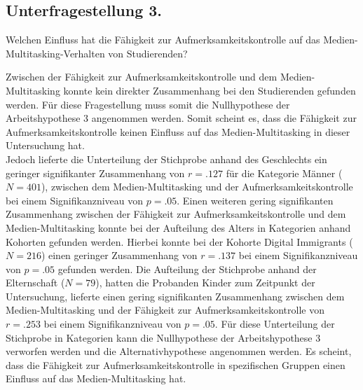 \subsection{Unterfragestellung 3.} Welchen Einfluss hat die Fähigkeit zur Aufmerksamkeitskontrolle auf das Medien-Multitasking-Verhalten von Studierenden?

Zwischen der Fähigkeit zur Aufmerksamkeitskontrolle und dem Medien-Multitasking konnte kein direkter Zusammenhang bei den Studierenden gefunden werden. Für diese Fragestellung muss somit die Nullhypothese der Arbeitshypothese 3 angenommen werden. Somit scheint es, dass die Fähigkeit zur Aufmerksamkeitskontrolle keinen Einfluss auf das Medien-Multitasking in dieser Untersuchung hat. \\
Jedoch lieferte die Unterteilung der Stichprobe anhand des Geschlechts ein geringer signifikanter Zusammenhang von $r=.127$ für die Kategorie Männer ($N=401$), zwischen dem Medien-Multitasking und der Aufmerksamkeitskontrolle bei einem Signifikanzniveau von $p=.05$. Einen weiteren gering signifikanten Zusammenhang zwischen der Fähigkeit zur Aufmerksamkeitskontrolle und dem Medien-Multitasking konnte bei der Aufteilung des Alters in Kategorien anhand Kohorten gefunden werden. Hierbei konnte bei der Kohorte Digital Immigrants ($N=216$) einen geringer Zusammenhang von $r=.137$ bei einem Signifikanzniveau von $p=.05$ gefunden werden. Die Aufteilung der Stichprobe anhand der Elternschaft ($N=79$), hatten die Probanden Kinder zum Zeitpunkt der Untersuchung, lieferte einen gering signifikanten Zusammenhang zwischen dem Medien-Multitasking und der Fähigkeit zur Aufmerksamkeitskontrolle von $r=.253$ bei einem Signifikanzniveau von $p=.05$. Für diese Unterteilung der Stichprobe in Kategorien kann die Nullhypothese der Arbeitshypothese 3 verworfen werden und die Alternativhypothese angenommen werden. Es scheint, dass die Fähigkeit zur Aufmerksamkeitskontrolle in spezifischen Gruppen einen Einfluss auf das Medien-Multitasking hat.

